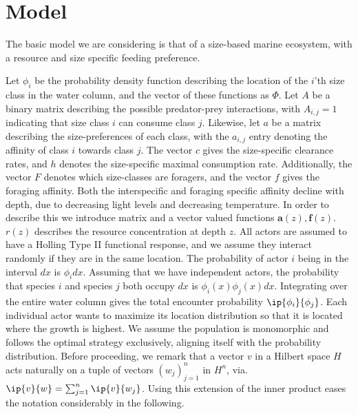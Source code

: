 
\section{Model}
The basic model we are considering is that of a size-based marine ecosystem, with a resource and size specific feeding preference. 

Let $\phi_i$ be the probability density function describing the location of the $i$'th size class in the water column, and the vector of these functions as $\Phi$. Let $A$ be a binary matrix describing the possible predator-prey interactions, with $A_{i,j} = 1$ indicating that size class $i$ can consume class $j$.
Likewise, let $a$ be a matrix describing the size-preferences of each class, with the $a_{i,j}$ entry denoting the affinity of class $i$ towards class $j$. The vector $c$ gives the size-specific clearance rates, and $h$ denotes the size-specific maximal consumption rate. 
Additionally, the vector $F$ denotes which size-classes are foragers, and the vector $f$ gives the foraging affinity. 
Both the interspecific and foraging specific affinity decline with depth, due to decreasing light levels and decreasing temperature. In order to describe this we introduce matrix and a vector valued functions $\mathbf{a}(z), \mathbf{f}(z)$. $r(z)$ describes the resource concentration at depth $z$.
All actors are assumed to have a Holling Type II functional response, and we assume they interact randomly if they are in the same location. The probability of actor $i$ being in the interval $dx$ is $\phi_i dx$. Assuming that we have independent actors, the probability that species $i$ and species $j$ both occupy $dx$ is $\phi_i(x) \phi_j(x) dx$. Integrating over the entire water column gives the total encounter probability $\ip{\phi_i}{\phi_j}$. Each individual actor wants to maximize its location distribution so that it is located where the growth is highest. We assume the population is monomorphic and follows the optimal strategy exclusively, aligning itself with the probability distribution. Before proceeding, we remark that a vector $v$ in a Hilbert space $H$ acts naturally on a tuple of vectors $(w_j)_{j = 1}^n$ in $H^n$, via. $\ip{v}{w} = \sum_{j =1}^n \ip{v}{w_j}$. Using this extension of the inner product eases the notation considerably in the following.  


